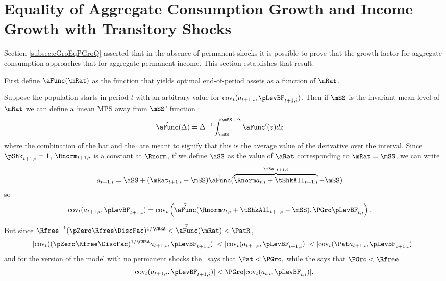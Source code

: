 \documentclass[\econtexRoot/BufferStockTheory]{subfiles}
\begin{document}
\section{Equality of Aggregate Consumption Growth and Income Growth with Transitory Shocks}\label{sec:ApndxCGroIsPGro}

Section \ref{subsec:cGroEqPGroQ} asserted that in the absence of permanent shocks it is possible to prove
that the growth factor for aggregate consumption approaches that for aggregate permanent
income.  This section establishes that result.

First define $\aFunc(\mRat)$ as the function that yields optimal end-of-period assets as a function of $\mRat$.

Suppose the population starts in period $t$ with an arbitrary value for
 $\mbox{cov}_{t}(a_{t+1,i},\pLevBF_{t+1,i})$. 
 Then if $\mSS$ is the invariant mean level of $\mRat$ we can define a `mean MPS away from $\mSS$' function
 \newcommand{\AMPS}{\bar{\acute{\aFunc}}}:
\begin{align}
 \AMPS(\Delta)  & =  \Delta^{-1}\int_{\mSS}^{\mSS+\Delta} \aFunc^{\prime}(z)
 dz \label{eq:checkaFunc} \nonumber
\end{align}
where the combination of the bar and the $\acute{}$ are meant to signify that this is the average value of the derivative over the interval.
Since $\pShk_{t+1,i}=1$, $\Rnorm_{t+1,i}$ is a constant at $\Rnorm$, if we define $\aSS$ as the value of $\aRat$ corresponding to $\mRat = \mSS$, we can write
\begin{align}
  a_{t+1,i} 
& =   \aSS+(\mRat_{t+1,i}-\mSS)\AMPS(\overbrace{\Rnorm
    a_{t,i}+\tShkAll_{t+1,i}}^{\mRat_{t+1,i}}-\mSS) \nonumber
\end{align}
so
\begin{align}
\mbox{cov}_{t}(a_{t+1,i},\pLevBF_{t+1,i})
 & = \mbox{cov}_{t}\left(\AMPS(\Rnorm  a_{t,i}+\tShkAll_{t+1,i}-\mSS)
  ,\PGro   \pLevBF_{t,i}\right). \nonumber
\end{align}

But since ${\Rfree}^{-1}(\pZero  \Rfree\DiscFac)^{1/\CRRA} < \AMPS(\mRat) < \PatR $,
\begin{equation}
  |\mbox{cov}_{t}((\pZero  \Rfree\DiscFac)^{1/\CRRA}a_{t+1,i},\pLevBF_{t+1,i})| <
  |\mbox{cov}_{t}(a_{t+1,i},\pLevBF_{t+1,i})| <
  |\mbox{cov}_{t}({\Pat}a_{t+1,i},\pLevBF_{t+1,i})| \nonumber
\end{equation}
and for the version of the model with no permanent shocks the \GIC~says that
${\Pat} < \PGro, $ while the {\FHWC} says that $\PGro < \Rfree$
\begin{align}
  |\mbox{cov}_{t}(a_{t+1,i},\pLevBF_{t+1,i})| < \PGro
  |\mbox{cov}_{t}(a_{t,i},\pLevBF_{t,i})|. \nonumber
\end{align}
\end{document}
